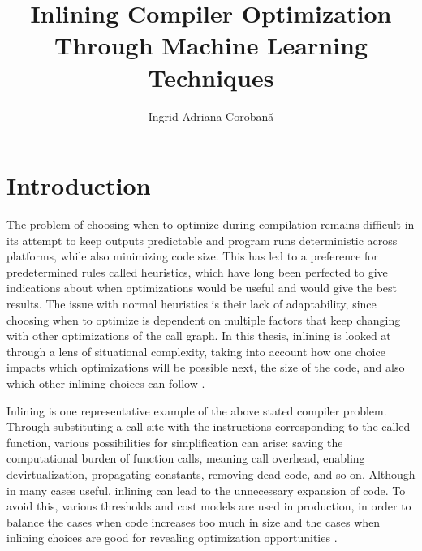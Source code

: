 \documentclass[12pt, a4paper]{report}
\title{Inlining Compiler Optimization\\Through Machine Learning Techniques}
\author{Ingrid-Adriana Corobană}
\begin{document}
\cleardoublepage
\pagestyle{front}
\let\ps@plain\ps@front
{}


\restoregeometry

\cleardoublepage
{}



\cleardoublepage
\begingroup
\small
{}
\setlength{\parskip}{0pt}
\tableofcontents
\endgroup

\cleardoublepage
\pagestyle{main}
\let\ps@plain\ps@main
{}



\chapter{Introduction}

The problem of choosing when to optimize during compilation remains difficult
in its attempt to keep outputs predictable and program runs deterministic
across platforms, while also minimizing code size. This has led to a preference
for predetermined rules called heuristics, which have long been perfected to
give indications about when optimizations would be useful and would give the
best results. The issue with normal heuristics is their lack of adaptability,
since choosing when to optimize is dependent on multiple factors that keep
changing with other optimizations of the call graph. In this thesis, inlining is
looked at through a lens of situational complexity, taking into account how one
choice impacts which optimizations will be possible next, the size of the code,
and also which other inlining choices can follow
\cite{godbolt2019optimizations,theodoridis2022optimal}.

Inlining is one representative example of the above stated compiler problem.
Through substituting a call site with the instructions corresponding to the
called function, various possibilities for simplification can arise: saving the
computational burden of function calls, meaning call overhead, enabling
devirtualization, propagating constants, removing dead code, and so on.
Although in many cases useful, inlining can lead to the unnecessary expansion
of code. To avoid this, various thresholds and cost models are used in
production, in order to balance the cases when code increases too much in size
and the cases when inlining choices are good for revealing optimization
opportunities
\cite{godbolt2019optimizations,theodoridis2022optimal,mlgo}.
\end{document}
